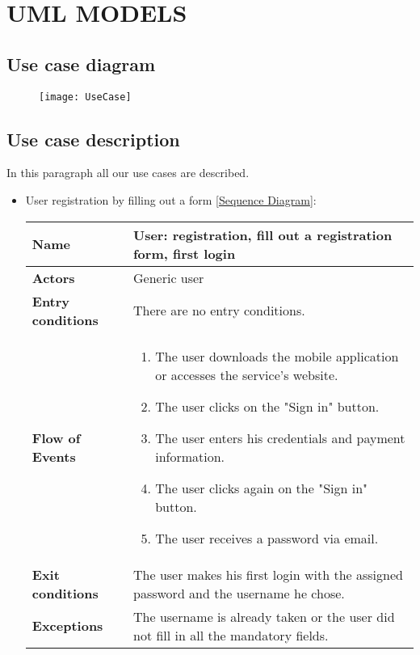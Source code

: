 \section{UML MODELS}
\subsection{Use case diagram}
\begin{figure}[H]
	\centering
	\texttt{[image: UseCase]}
\end{figure}
\newpage
\subsection{Use case description}
In this paragraph all our use cases are described.
\begin{itemize}
	\item User registration by filling out a form [\hyperlink{UserRegistration}{Sequence Diagram}]:
	\begin{table}[H]
		\centering
		\begin{tabular}{| m{3.5cm} | m{9.5cm} |}
			\hline
			\textbf{Name} & User: registration, fill out a registration form, first login\\
			\hline
			\textbf{Actors} & Generic user\\
			\hline
			\textbf{Entry conditions} & There are no entry conditions.\\
			\hline
			\textbf{Flow of Events} & 
			\begin{enumerate}
				\item The user downloads the mobile application or accesses the service's website.
				\item The user clicks on the "Sign in" button.
				\item The user enters his credentials and payment information.
				\item The user clicks again on the "Sign in" button.
				\item The user receives a password via email.
			\end{enumerate} \\
			\hline
			\textbf{Exit conditions} & The user makes his first login with the assigned password and the username he chose.\\
			\hline
			\textbf{Exceptions} & The username is already taken or the user did not fill in all the mandatory fields. \\
			\hline
		\end{tabular}
	\end{table}

\end{itemize}
